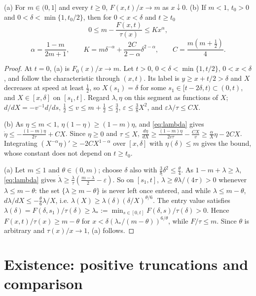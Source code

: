 \documentclass[11pt,a4paper]{report}
\newcommand{\eps}{\varepsilon}
\begin{document}
\begin{lemma}\label{lem:slope}
(a) For \(m\in(0,1]\) and every \(t\ge0\), \(F(x,t)/x\to m\) as \(x\downarrow0\).
(b) If \(m<1\), \(t_0>0\) and \(0<\delta<\min\{1,t_0/2\}\), then for \(0<x<\delta\) and \(t\ge t_0\)
\[
0\le m-\frac{F(x,t)}{\tau(x)}\le Kx^\alpha,
\]
\[
\alpha=\frac{1-m}{2m+1},\qquad K=m\delta^{-\alpha}+\frac{2C}{2-\alpha}\delta^{2-\alpha},\qquad
C=\frac{m(m+\frac12)}4 .
\]
\end{lemma}
\begin{proof}
At \(t=0\), (a) is \(F_0(x)/x\to m\). Let \(t>0\), \(0<\delta<\min\{1,t/2\}\), \(0<x<\delta\), and follow the
characteristic through \((x,t)\). Its label is \(y\ge x+t/2>\delta\) and \(X\) decreases at speed at least
\(\frac12\), so \(X(s_1)=\delta\) for some \(s_1\in[t-2\delta,t)\subset(0,t)\), and \(X\in[x,\delta]\) on
\([s_1,t]\). Regard \(\lambda,\eta\) on this segment as functions of \(X\); \(d/dX=-v^{-1}d/ds\),
\(\frac12\le v\le m+\frac12\le\frac32\), \(\eps\le\frac38X^2\), and \(\eps\lambda/\tau\le CX\).

(b) As \(\eta\le m<1\), \(\eta(1-\eta)\ge(1-m)\eta\), and \eqref{eq:lambda} gives
\(\dot\eta\le-\frac{(1-m)\eta}{2\tau}+CX\). Since \(\eta\ge0\) and \(\tau\le X\),
\(\frac{d\eta}{dX}\ge\frac{(1-m)\eta}{2v\tau}-\frac{CX}{v}\ge\frac{\alpha}{X}\eta-2CX\). Integrating
\((X^{-\alpha}\eta)'\ge-2CX^{1-\alpha}\) over \([x,\delta]\) with \(\eta(\delta)\le m\) gives the bound, whose
constant does not depend on \(t\ge t_0\).

(a) Let \(m\le1\) and \(\theta\in(0,m)\); choose \(\delta\) also with \(\frac38\delta^2\le\frac\theta4\). As
\(1-m+\lambda\ge\lambda\), \eqref{eq:lambda} gives \(\dot\lambda\ge\frac\lambda\tau(\frac{m-\lambda}2-\eps)\).
So on \([s_1,t]\), \(\dot\lambda\ge\theta\lambda/(4\tau)>0\) whenever \(\lambda\le m-\theta\): the set
\(\{\lambda\ge m-\theta\}\) is never left once entered, and while \(\lambda\le m-\theta\),
\(d\lambda/dX\le-\frac\theta6\lambda/X\), i.e. \(\lambda(X)\ge\lambda(\delta)(\delta/X)^{\theta/6}\). The entry
value satisfies \(\lambda(\delta)=F(\delta,s_1)/\tau(\delta)\ge\lambda_*:=\min_{s\in[0,t]}F(\delta,s)/\tau(\delta)>0\).
Hence \(F(x,t)/\tau(x)\ge m-\theta\) for \(x<\delta(\lambda_*/(m-\theta))^{6/\theta}\), while
\(F/\tau\le m\). Since \(\theta\) is arbitrary and \(\tau(x)/x\to1\), (a) follows.
\end{proof}

\section{Existence: positive truncations and comparison}\label{sec:existence}
\end{document}
